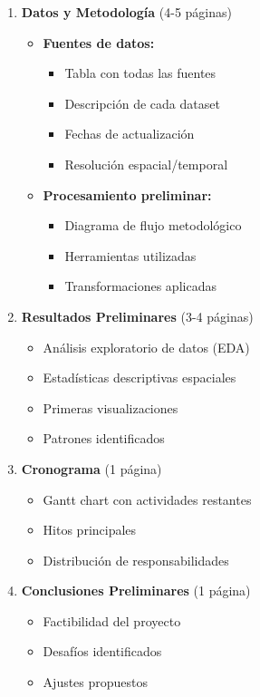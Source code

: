 \documentclass[11pt,letterpaper]{article}
\begin{document}
\begin{enumerate}[label=\arabic*.]
    \item \textbf{Datos y Metodología} (4-5 páginas)
    \begin{itemize}
        \item \textbf{Fuentes de datos:}
        \begin{itemize}
            \item Tabla con todas las fuentes
            \item Descripción de cada dataset
            \item Fechas de actualización
            \item Resolución espacial/temporal
        \end{itemize}
        \item \textbf{Procesamiento preliminar:}
        \begin{itemize}
            \item Diagrama de flujo metodológico
            \item Herramientas utilizadas
            \item Transformaciones aplicadas
        \end{itemize}
    \end{itemize}

    \item \textbf{Resultados Preliminares} (3-4 páginas)
    \begin{itemize}
        \item Análisis exploratorio de datos (EDA)
        \item Estadísticas descriptivas espaciales
        \item Primeras visualizaciones
        \item Patrones identificados
    \end{itemize}

    \item \textbf{Cronograma} (1 página)
    \begin{itemize}
        \item Gantt chart con actividades restantes
        \item Hitos principales
        \item Distribución de responsabilidades
    \end{itemize}

    \item \textbf{Conclusiones Preliminares} (1 página)
    \begin{itemize}
        \item Factibilidad del proyecto
        \item Desafíos identificados
        \item Ajustes propuestos
    \end{itemize}
\end{enumerate}
\end{document}

